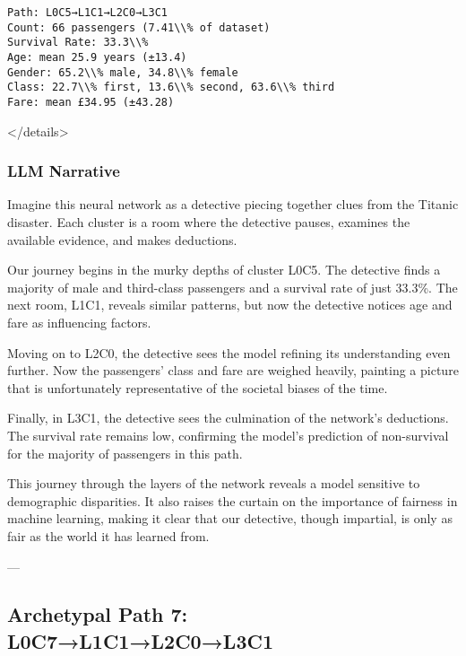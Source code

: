 \begin{verbatim}
Path: L0C5→L1C1→L2C0→L3C1
Count: 66 passengers (7.41\\% of dataset)
Survival Rate: 33.3\\%
Age: mean 25.9 years (±13.4)
Gender: 65.2\\% male, 34.8\\% female
Class: 22.7\\% first, 13.6\\% second, 63.6\\% third
Fare: mean £34.95 (±43.28)
\end{verbatim}
</details>

\subsubsection*{LLM Narrative}

Imagine this neural network as a detective piecing together clues from the Titanic disaster. Each cluster is a room where the detective pauses, examines the available evidence, and makes deductions.

Our journey begins in the murky depths of cluster L0C5. The detective finds a majority of male and third-class passengers and a survival rate of just 33.3\%. The next room, L1C1, reveals similar patterns, but now the detective notices age and fare as influencing factors. 

Moving on to L2C0, the detective sees the model refining its understanding even further. Now the passengers' class and fare are weighed heavily, painting a picture that is unfortunately representative of the societal biases of the time. 

Finally, in L3C1, the detective sees the culmination of the network's deductions. The survival rate remains low, confirming the model's prediction of non-survival for the majority of passengers in this path.

This journey through the layers of the network reveals a model sensitive to demographic disparities. It also raises the curtain on the importance of fairness in machine learning, making it clear that our detective, though impartial, is only as fair as the world it has learned from.

---

\subsection*{Archetypal Path 7: L0C7→L1C1→L2C0→L3C1}

